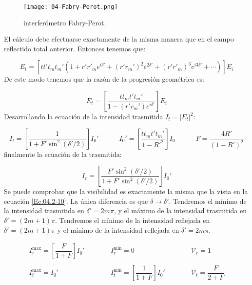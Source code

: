 \documentclass[12pt,a4paper]{book}
\numberwithin{equation}{section}
\numberwithin{figure}{section}
\newcommand{\tquad}{\quad \quad \quad}
\newcommand{\parentesis}[1]{\left( #1  \right)}
\newcommand{\ccorchetes}[1]{\left[ #1  \right]}
\newcommand{\1}{_{(1)}}
\newcommand{\2}{_{(2)}}
\theoremstyle{definition}
\begin{document}
\begin{figure}[h!] \centering
\texttt{[image: 04-Fabry-Perot.png]}
\caption{interferómetro Fabry-Perot.}
\end{figure} 

El cálculo debe efectuarse exactamente de la misma manera que en el campo reflectido total anterior. Entonces tenemos que:

\begin{equation}
E_t = \ccorchetes{tt't_mt_m'\parentesis{1+r'r'_m e^{i\delta'} + (r'r_m')^2e^{2\delta'}+(r'r'_m)^3e^{i3\delta'} + \cdots}} E_i
\end{equation}
De este modo tenemos que la razón de la progresión geométrica es:

\begin{equation}
E_t = \ccorchetes{\frac{tt_mt't_m'}{1-(r'r_m')e^{i\delta'}}} E_i
\end{equation}
Desarrollando la ecuación de la intensidad trasmitida $I_t = |E_t|^2$:

\begin{equation}
I_t = \ccorchetes{ \frac{1}{1+F'\sin^2(\delta'/2)}}I_0' \tquad I_0' = \ccorchetes{\frac{tt_m t't_m'}{1-R'^2}} I_0 \tquad F=\frac{4R'}{(1-R')^2}
\end{equation}
finalmente la ecuación de la trasmitida:

\begin{equation}
I_r =\ccorchetes{\frac{F' \sin^2(\delta'/2)}{1+F' \sin^2(\delta'/2)}} I_0'
\end{equation}
Se puede comprobar que la visibilidad es exactamente la misma que  la vista en la ecuación \ref{Ec:04.2-10}. La única diferencia es que $\delta \rightarrow \delta'$. Tendremos el mínimo de la intensidad trasmitida en $\delta'=2m\pi$, y el máximo de la intensidad trasmitida en $\delta'=(2m+1)\pi$. Tendremos el mínimo de la intensidad reflejada en $\delta'=(2m+1)\pi$ y el mínimo de la intensidad reflejada en $\delta'=2m\pi$. 

\begin{equation}
\begin{array}{ccc}
I_{r}^{\max} = \ccorchetes{ \dfrac{F}{1+F}}I_0' & \tquad I_{r}^{\min} = 0  & \tquad \mathcal{V}_r=1
\\ \\
I_{t}^{\max} = I_0'  & \tquad I_{t}^{\min} = \ccorchetes{\dfrac{1}{1+F} }I_0' & \tquad \mathcal{V}_t=\dfrac{F}{2+F}
\end{array}
\end{equation}
\end{document}
